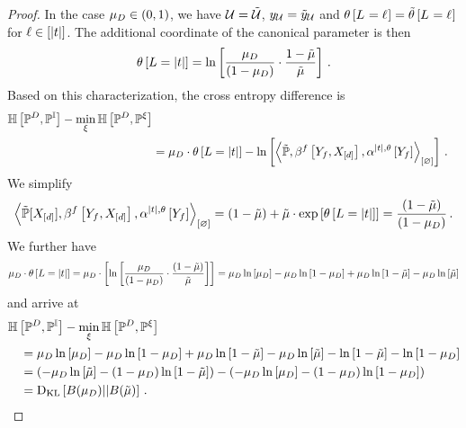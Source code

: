 \begin{proof}
    In the case $\mu_{D}\in(0,1)$, we have $\mathcal{U}=\tilde{\mathcal{U}}$, $y_{\mathcal{U}}=\tilde{y}_{\mathcal{U}}$ and $\theta\left[L_{}=\ell_{}\right]=\tilde{\theta}\left[L_{}=\ell_{}\right]$ for $\ell\in[\left|t\right|]$.
    The additional coordinate of the canonical parameter is then
    \begin{align*}
        \theta\left[L=\left|t\right|\right] = \ln \left[ 
            \frac{\mu_{D}}{(1-\mu_{D})}
            \cdot \frac{1-\tilde{\mu}}{\tilde{\mu}}
         \right] \, .
    \end{align*}
    Based on this characterization, the cross entropy difference is
    \begin{align*}
        \centropyof{\empdistribution}{\probof{\ones}} - \min_{\acttensor} \centropyof{\empdistribution}{\probof{\acttensor}} \\
        &= \datamean \cdot \canparamat{\selvariable=\cardof{\hlnstat}}
        - \lnof{\contraction{\secprobtensor,\formulaccwith,\softactsymbolofat{\cardof{\hlnstat},\canparam}{\formulavar}}} \, .
    \end{align*}
    We simplify
    \begin{align*}
        \contraction{\secprobwith,\formulaccwith,\softactsymbolofat{\cardof{\hlnstat},\canparam}{\formulavar}}
        = (1-\currentmean) + \currentmean \cdot \expof{\canparamat{\selvariable=\cardof{\hlnstat}}}
        = \frac{(1-\currentmean)}{(1-\datamean)} \, .
    \end{align*}
    We further have
    \begin{align*}
        \mu_{D} \cdot \theta\left[L=\left|t\right|\right]
        = \mu_{D} \cdot \left[ \ln \left[ \frac{\mu_{D}}{(1-\mu_{D})}\cdot \frac{(1-\tilde{\mu})}{\tilde{\mu}} \right]  \right]
        = \mu_{D} \ln \left[ \mu_{D} \right] - \mu_{D} \ln \left[ 1-\mu_{D} \right] + \mu_{D} \ln \left[ 1-\tilde{\mu} \right] - \mu_{D} \ln \left[ \tilde{\mu} \right]
    \end{align*}
    and arrive at
    \begin{align*}
        &  \mathbb{H}\left[\mathbb{P}^{D},\mathbb{P}^{\mathbb{I}}\right] - \min_{\xi} \mathbb{H}\left[\mathbb{P}^{D},\mathbb{P}^{\xi}\right] \\
        & \quad =  \mu_{D} \ln \left[ \mu_{D} \right] - \mu_{D} \ln \left[ 1-\mu_{D} \right] + \mu_{D} \ln \left[ 1-\tilde{\mu} \right] - \mu_{D} \ln \left[ \tilde{\mu} \right]
        -  \ln \left[ 1-\tilde{\mu} \right] - \ln \left[ 1-\mu_{D} \right] \\
        & \quad = \left( -\mu_{D} \ln \left[ \tilde{\mu} \right] - (1-\mu_{D}) \ln \left[ 1-\tilde{\mu} \right] \right)  - \left( -\mu_{D} \ln \left[ \mu_{D} \right] - (1-\mu_{D}) \ln \left[ 1-\mu_{D} \right] \right) \\
        & \quad = \mathrm{D}_{\mathrm{KL}}\left[ B(\mu_{D}) || B(\tilde{\mu}) \right] \, .
    \end{align*}


\end{proof}
